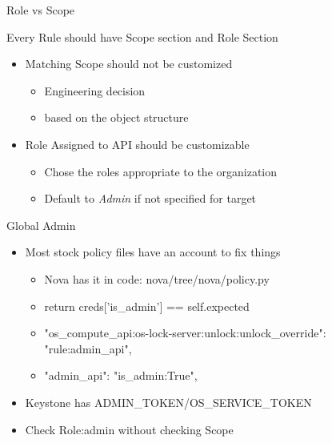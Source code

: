 \documentclass{beamer}
\begin{document}
\begin{frame}{Role vs Scope}

  Every Rule should have Scope section and Role Section
  
  \begin{itemize}
  \item Matching Scope should not be customized
    \begin{itemize}
    \item  Engineering decision
    \item  based on the object structure
    \end{itemize}
  \item Role Assigned to API should be customizable
    \begin{itemize}
    \item Chose the roles appropriate to the organization
    \item Default to \textit{Admin} if not specified for target
    \end{itemize}
  \end{itemize}
\end{frame}
  

\begin{frame}{Global Admin}
  \begin{itemize}
  \item Most stock policy files have an account to fix things
    \begin{itemize}
    \item Nova has it in code: nova/tree/nova/policy.py
    \item return creds['is\_admin'] == self.expected
    \item "os\_compute\_api:os-lock-server:unlock:unlock\_override": "rule:admin\_api",
    \item "admin\_api": "is\_admin:True",
    \end {itemize}
  \item Keystone has  ADMIN\_TOKEN/OS\_SERVICE\_TOKEN
  \item Check Role:admin without checking Scope
  \end{itemize}
\end{frame}
\end{document}
